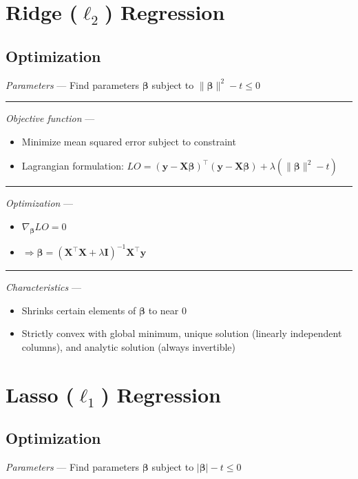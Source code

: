 \section{Ridge ($\ell_2$) Regression}
\subsection*{Optimization}
\emph{Parameters} --- Find parameters $\boldsymbol{\beta}$ subject to $\|\boldsymbol{\beta}\|^2 - t \leq 0$

{\color{lightgray}\hrule height 0.001mm}

\emph{Objective function} --- 
\begin{itemize}
    \item Minimize mean squared error subject to constraint
    \item Lagrangian formulation: $LO = ( \boldsymbol{y} - \boldsymbol{X}\boldsymbol{\beta})^\intercal( \boldsymbol{y} - \boldsymbol{X}\boldsymbol{\beta} ) + \lambda ( \|\boldsymbol{\beta}\|^2 - t )$
\end{itemize}

{\color{lightgray}\hrule height 0.001mm}

\emph{Optimization} ---
\begin{itemize}
    \item $\nabla_{\boldsymbol{\beta}} LO = 0$
    \item $\Rightarrow \boldsymbol{\beta} = (\boldsymbol{X}^\intercal \boldsymbol{X} + \lambda \boldsymbol{I})^{-1}  \boldsymbol{X}^\intercal \boldsymbol{y}$
\end{itemize}

{\color{lightgray}\hrule height 0.001mm}

\emph{Characteristics} ---
\begin{itemize}
    \item Shrinks certain elements of $\boldsymbol{\beta}$ to near 0
    \item Strictly convex with global minimum, unique solution (linearly independent columns), and analytic solution (always invertible)
\end{itemize}

\section{Lasso ($\ell_1$) Regression}
\subsection*{Optimization}
\emph{Parameters} --- Find parameters $\boldsymbol{\beta}$ subject to $|\boldsymbol{\beta}| - t \leq 0$

